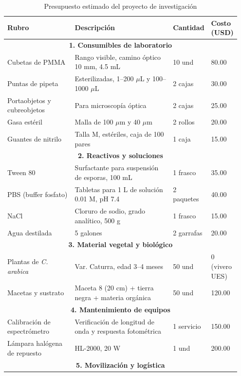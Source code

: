 \documentclass[12pt, a4paper]{article}
\begin{document}
	\begin{table}
		\caption{Presupuesto estimado del proyecto de investigación}
		\label{tab:presupuesto}
		\begin{tabular}{p{0.3\linewidth}p{0.45\linewidth}p{0.1\linewidth}p{0.1\linewidth}}
			\toprule
			\textbf{Rubro} & \textbf{Descripción} & \textbf{Cantidad} & \textbf{Costo (USD)} \\
			\midrule
			\multicolumn{4}{c}{\textbf{1. Consumibles de laboratorio}} \\
			\midrule
			Cubetas de PMMA & Rango visible, camino óptico 10 mm, 4.5 mL & 10 und & 80.00 \\
			Puntas de pipeta & Esterilizadas, 1--200 $\mu$L y 100--1000 $\mu$L & 2 cajas & 30.00 \\
			Portaobjetos y cubreobjetos & Para microscopía óptica & 2 cajas & 25.00 \\
			Gasa estéril & Malla de 100 $\mu$m y 40 $\mu$m & 2 rollos & 20.00 \\
			Guantes de nitrilo & Talla M, estériles, caja de 100 pares & 1 caja & 15.00 \\
			\midrule
			\multicolumn{4}{c}{\textbf{2. Reactivos y soluciones}} \\
			\midrule
			Tween 80 & Surfactante para suspensión de esporas, 100 mL & 1 frasco & 35.00 \\
			PBS (buffer fosfato) & Tabletas para 1 L de solución 0.01 M, pH 7.4 & 2 paquetes & 40.00 \\
			NaCl & Cloruro de sodio, grado analítico, 500 g & 1 frasco & 15.00 \\
			Agua destilada & 5 galones & 2 garrafas & 20.00 \\
			\midrule
			\multicolumn{4}{c}{\textbf{3. Material vegetal y biológico}} \\
			\midrule
			Plantas de \textit{C. arabica} & Var. Caturra, edad 3--4 meses & 50 und & 0 (vivero UES) \\
			Macetas y sustrato & Maceta 8 (20 cm) + tierra negra + materia orgánica & 50 und & 120.00 \\
			\midrule
			\multicolumn{4}{c}{\textbf{4. Mantenimiento de equipos}} \\
			\midrule
			Calibración de espectrómetro & Verificación de longitud de onda y respuesta fotométrica & 1 servicio & 150.00 \\
			Lámpara halógena de repuesto & HL-2000, 20 W & 1 und & 200.00 \\
			\midrule
			\multicolumn{4}{c}{\textbf{5. Movilización y logística}} \\

\end{tabular}
\end{table}
\end{document}
